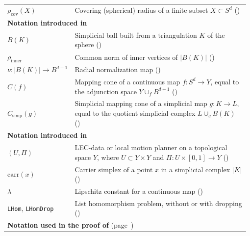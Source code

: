 \documentclass[a4paper,english,cleveref,autoref,thm-restate,nolineno]{socg-lipics-v2021}
\newcommand{\geomreal}[1] { |#1| } %
\newcommand{\carr}[1] { \mathrm{carr}(#1) } %
\newcommand{\conesimp}[1] { C_\mathrm{simp}(#1) } %
\newcommand{\cone}[1] { C(#1) } %
\begin{document}
\begin{longtable}{p{0.26\linewidth}p{0.72\linewidth}}
	$\rho_\mathrm{cov}(X)$ & Covering (spherical) radius of a finite subset $X\subset S^d$ (\Cref{subsec:global_delaunay_refinements})\\
	
	\multicolumn{2}{l}{\textbf{Notation introduced in \Cref{sec:simplicial_mapping_cones}} } \\
	
	$B(K)$ & Simplicial ball built from a triangulation $K$ of the sphere (\Cref{subsec:triangulation_ball}) \\
	
	$\rho_{\mathrm{inner}}$ & Common norm of inner vertices of $\geomreal{B(K)}$ (\Cref{subsec:triangulation_ball}) \\
	
	$\nu \colon \geomreal{B(K)} \to B^{d+1}$ & Radial normalization map (\Cref{subsec:triangulation_ball}) \\
	
	$\cone{f}$ & Mapping cone of a continuous map $f\colon S^{d}\to Y$, equal to the adjunction space $Y\cup_f B^{d+1}$ (\Cref{subsec:equivalence_mapping_cones}) \\
	
	$\conesimp{g}$ & Simplicial mapping cone of a simplicial map $g\colon K\to L$, equal to the quotient simplicial complex $L\cup_g B(K)$ (\Cref{subsec:equivalence_mapping_cones}) \\
	
	\multicolumn{2}{l}{\textbf{Notation introduced in \Cref{sec:approximation}} } \\
	
	$(U,\Pi)$ & LEC-data or local motion planner on a topological space $Y$, where $U\subset Y\times Y$ and $\Pi\colon U\times[0,1]\to Y$ (\Cref{subsec:lec}) \\
	
	$\carr{x}$ & Carrier simplex of a point $x$ in a simplicial complex $\geomreal{K}$ (\Cref{subsec:approximation_routine}) \\
	
	$\lambda$ & Lipschitz constant for a continuous map (\Cref{subsec:approximation_routine}) \\
	
	\texttt{LHom}, \texttt{LHomDrop} & List homomorphism problem, without or with dropping (\Cref{subsec:approximation_routine}) \\
	
	\multicolumn{2}{l}{\textbf{Notation used in the proof of \Cref{th:lec_data_gluing}} (page~\pageref{proof:lec_data_gluing})} \\
	

\end{longtable}
\end{document}
